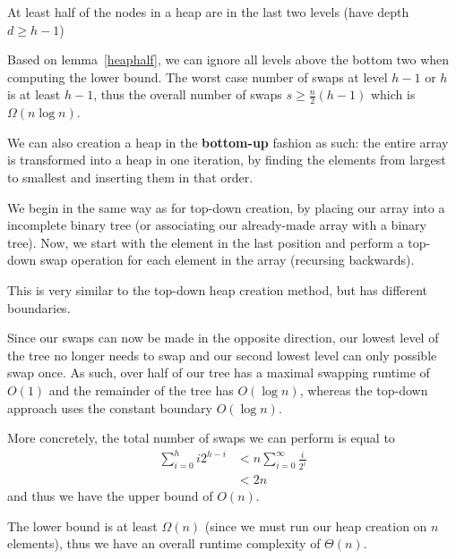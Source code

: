 \documentclass[12pt]{article}
\begin{document}
\begin{lemma}
\label{heaphalf}
At least half of the nodes in a heap are in the last two levels (have depth $d \geq h - 1$)
\end{lemma}

Based on lemma~\ref{heaphalf}, we can ignore all levels above the bottom two when computing the lower bound. The worst case number of swaps at level $h-1$ or $h$ is at least $h-1$, thus the overall number of swaps $s \geq \frac{n}{2} (h-1)$ which is $\Omega(n\log n)$.

We can also creation a heap in the {\bf bottom-up} fashion as such: the entire array is transformed into a heap in one iteration, by finding the elements from largest to smallest and inserting them in that order.

We begin in the same way as for top-down creation, by placing our array into a incomplete binary tree (or associating our already-made array with a binary tree). Now, we start with the element in the last position and perform a top-down swap operation for each element in the array (recursing backwards).

This is very similar to the top-down heap creation method, but has different boundaries.

Since our swaps can now be made in the opposite direction, our lowest level of the tree no longer needs to swap and our second lowest level can only possible swap once. As such, over half of our tree has a maximal swapping runtime of $O(1)$ and the remainder of the tree has $O(\log n)$, whereas the top-down approach uses the constant boundary $O(\log n)$.

More concretely, the total number of swaps we can perform is equal to
\begin{align*}
\sum_{i=0}^h i2^{h-i} &< n\sum_{i=0}^\infty \frac{i}{2^i}\\
&< 2n
\end{align*}
and thus we have the upper bound of $O(n)$.

The lower bound is at least $\Omega(n)$ (since we must run our heap creation on $n$ elements), thus we have an overall runtime complexity of $\Theta(n)$.
\end{document}
